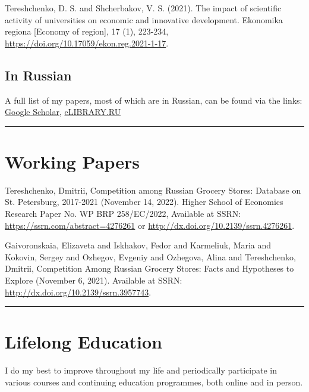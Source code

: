 \documentclass[10pt]{article}
\newcommand{\years}[1]{\marginnote{\scriptsize #1}}
\begin{document}
\vspace{1em}

\years{2021}Tereshchenko, D. S. and Shcherbakov, V. S. (2021). The impact of scientific activity of universities on economic and innovative development. Ekonomika regiona [Economy of region], 17 (1), 223-234, \url{https://doi.org/10.17059/ekon.reg.2021-1-17}.

\subsection*{In Russian}
\noindent
\years{2011-2021}A full list of my papers, most of which are in Russian, can be found via the links: \href{https://scholar.google.ru/citations?user=V_XLJ0kAAAAJ&hl=en}{Google Scholar}, \href{https://elibrary.ru/author_items.asp?authorid=640419&pubrole=100&show_refs=1&show_option=0}{eLIBRARY.RU}

\vspace{2em}
\hrule


\section*{Working Papers}
\noindent
\years{2022}Tereshchenko, Dmitrii, Competition among Russian Grocery Stores: Database on St. Petersburg, 2017-2021 (November 14, 2022). Higher School of Economics Research Paper No. WP BRP 258/EC/2022, Available at SSRN: \url{https://ssrn.com/abstract=4276261} or \url{http://dx.doi.org/10.2139/ssrn.4276261}.

\vspace{1em}

\years{2021}Gaivoronskaia, Elizaveta and Iskhakov, Fedor and Karmeliuk, Maria and Kokovin, Sergey and Ozhegov, Evgeniy and Ozhegova, Alina and Tereshchenko, Dmitrii, Competition Among Russian Grocery Stores: Facts and Hypotheses to Explore (November 6, 2021). Available at SSRN: \url{http://dx.doi.org/10.2139/ssrn.3957743}. 

\vspace{2em}
\hrule


\section*{Lifelong Education}
\noindent
I do my best to improve throughout my life and periodically participate in various courses and continuing education programmes, both online and in person.
\vspace{1em}
\end{document}
